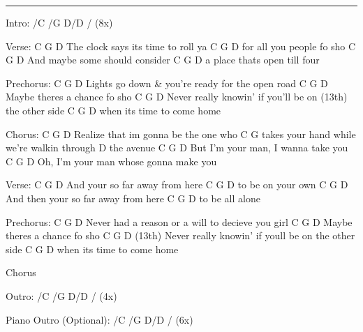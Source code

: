 \noindent\rule{\columnwidth}{1pt}

\begin{multicols}{2}
\begin{lstsong}
Intro: /C /G D/D / (8x)

Verse:
    C              G       D
The clock says its time to roll ya
C             G         D
  for all you people fo sho
C          G              D
 And maybe some should consider
C               G         D
  a place thats open till four

Prechorus:
C         G             D
Lights go down & you're ready for the open road
   C           G         D
Maybe theres a chance fo sho
C               G             D         
Never really knowin' if you'll be on
   (13th)
the other side
C        G          D
when its time to come home

Chorus:
C             G             D
Realize that im gonna be the one who
C                           G 
takes your hand while we're walkin through
   D
the avenue
C            G            D
But I'm your man, I wanna take you
C    G        D
Oh, I'm your man whose gonna make you
\end{lstsong}
\columnbreak
\begin{lstsong}
Verse:
C          G        D
And your so far away from here
C      G      D
to be on your own
C            G           D
And then your so far away from here
C     G    D
to be all alone

Prechorus:
C           G           D
Never had a reason or a will to decieve you girl
C             G         D
Maybe theres a chance fo sho
C              G         D           (13th)
Never really knowin' if youll be on the other side
C             G         D
when its time to come home

Chorus

Outro: /C /G D/D /  (4x)

Piano Outro (Optional): /C /G D/D / (6x)
\end{lstsong}
\end{multicols}
\newpage


